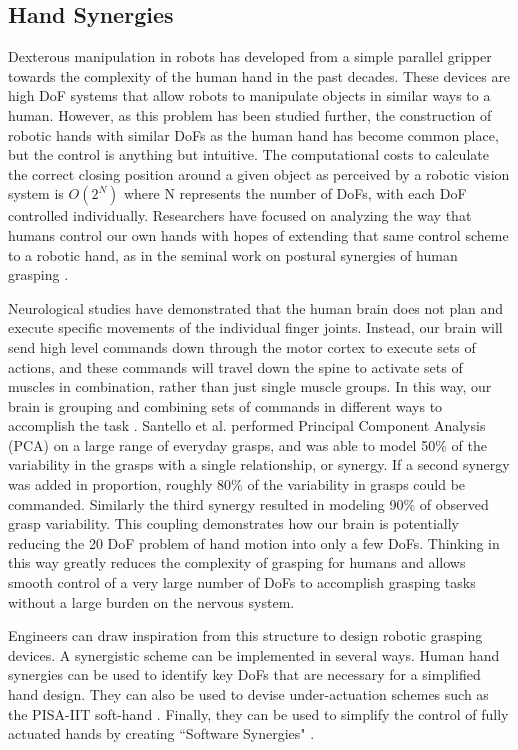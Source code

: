 \documentclass[runningheads,a4paper]{llncs}
\begin{document}
\subsection{Hand Synergies}
	Dexterous manipulation in robots has developed from a simple parallel gripper towards the complexity of the human hand in the past decades. These devices are high DoF systems that allow robots to manipulate objects in similar ways to a human. However, as this problem has been studied further, the construction of robotic hands with similar DoFs as the human hand has become common place, but the control is anything but intuitive. The computational costs to calculate the correct closing position around a given object as perceived by a robotic vision system is $O(2^N)$
 where N represents the number of DoFs, with each DoF controlled individually. Researchers have focused on analyzing the way that humans control our own hands with hopes of extending that same control scheme to a robotic hand, as in the seminal work on postural synergies of human grasping \cite{Santello}. 

Neurological studies have demonstrated that the human brain does not plan and execute specific movements of the individual finger joints. Instead, our brain will send high level commands down through the motor cortex to execute sets of actions, and these commands will travel down the spine to activate sets of muscles in combination, rather than just single muscle groups. In this way, our brain is grouping and combining sets of commands in different ways to accomplish the task \cite{neuro}.  Santello et al. performed Principal Component Analysis (PCA) on a large range of everyday grasps, and was able to model 50$\%$ of the variability in the grasps with a single relationship, or synergy. If a second synergy was added in proportion, roughly 80$\%$  of the variability in grasps could be commanded. Similarly the third synergy resulted in modeling 90$\%$  of observed grasp variability. This coupling demonstrates how our brain is potentially reducing the 20 DoF problem of hand motion into only a few DoFs. Thinking in this way greatly reduces the complexity of grasping for humans and allows smooth control of a very large number of DoFs to accomplish grasping  tasks without a large burden on the nervous system. 

 Engineers can draw inspiration from this structure to design robotic grasping devices.  A synergistic scheme can be implemented in several ways.  Human hand synergies can be used to identify key DoFs that are necessary for a simplified hand design.  They can also be used to devise under-actuation schemes such as the PISA-IIT soft-hand \cite{softhand}.  Finally, they can be used to simplify the control of fully actuated hands by creating ``Software Synergies" \cite{catalano_2012_adaptive}.  
\end{document}
